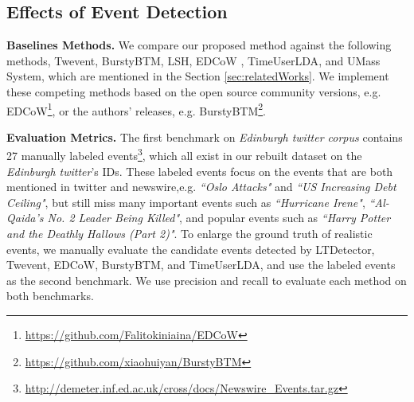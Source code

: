 \documentclass{article}
\begin{document}

\subsection{Effects of Event Detection}
\textbf{Baselines Methods.} We compare our proposed method against the following methods, Twevent\cite{Twevent2012}, BurstyBTM\cite{Yan:2015wm}, LSH\cite{Petrovic:2010uj}, EDCoW \cite{Weng:2011wz}, TimeUserLDA\cite{Diao:2012wj}, and UMass System\cite{Allan:2000wu}, which are mentioned in the Section \ref{sec:relatedWorks}.
We implement these competing methods based on the open source community versions, e.g. EDCoW\footnote{\url{https://github.com/Falitokiniaina/EDCoW}}, or the authors' releases, e.g. BurstyBTM\footnote{\url{https://github.com/xiaohuiyan/BurstyBTM}}.

\textbf{Evaluation Metrics.} 
The first benchmark on \textit{Edinburgh twitter corpus} contains 27 manually labeled events\cite{petrovic2013can}\footnote{\url{http://demeter.inf.ed.ac.uk/cross/docs/Newswire_Events.tar.gz}}, which all exist in our rebuilt dataset on the \textit{Edinburgh twitter}'s IDs.
These labeled events focus on the events that are both mentioned in twitter and newswire,e.g. \textit{``Oslo Attacks"} and \textit{``US Increasing Debt Ceiling"}, but still miss many important events such as \textit{``Hurricane Irene"}, \textit{``Al-Qaida's No. 2 Leader Being Killed"}, and popular events such as \textit{``Harry Potter and the Deathly Hallows (Part 2)"}.
To enlarge the ground truth of realistic events, we manually evaluate the candidate events detected by LTDetector, Twevent, EDCoW, BurstyBTM, and TimeUserLDA, and  use the labeled events as the second benchmark.
We use precision and recall to evaluate each method on both benchmarks.
\end{document}
